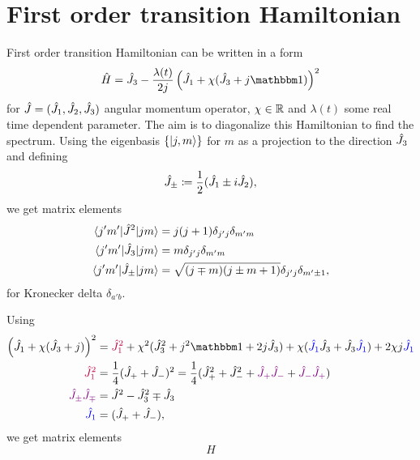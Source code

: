 \chapter{First order transition Hamiltonian}
First order transition Hamiltonian can be written in a form
\begin{equation}
    \HH=\J_3-\frac{\lambda(t)}{2j}\left(\J_1+\chi(\J_3+j\Id)\right)^2
    \label{eq:firstOrderTransitionHamiltonian}
\end{equation}
for $\hat{J}=(\hat{J}_1,\hat{J}_2,\hat{J}_3)$ angular momentum operator, $\chi\in\mathbb{R}$ and $\lambda(t)$ some real time dependent parameter. The aim is to diagonalize this Hamiltonian to find the spectrum. Using the eigenbasis $\{\ket{j,m}\}$ for $m$ as a projection to the direction $\hat{J}_3$ and defining
\begin{equation}
    \hat{J}_\pm\coloneqq\frac{1}{2}(\hat{J}_1\pm i\hat{J}_2),
\end{equation}
we get matrix elements
\begin{align}
    \braket{j'm'|\hat{J}^2|jm} &= j(j+1)\delta_{j'j}\delta_{m'm}\\
    \braket{j'm'|\hat{J}_3|jm} &= m \delta_{j'j}\delta_{m'm}\\
    \braket{j'm'|\hat{J}_\pm|jm} &= \sqrt{(j\mp m)(j\pm m+1)}\delta_{j'j}\delta_{m'\pm 1},
\end{align}
for Kronecker delta $\delta_{a'b}$.

Using
\begin{align}
        \left(\J_1+\chi(\J_3+j)\right)^2 &= \textcolor{purple}{\J_1^2} +\chi^2 (\J_3^2+j^2\Id+2j\J_3)+\chi(\textcolor{blue}{\J_1}\J_3+\J_3\textcolor{blue}{\J_1})+2\chi j\textcolor{blue}{\J_1}\\
        \textcolor{purple}{\J_1^2}&= \frac{1}{4}(\J_++\J_-)^2= \frac{1}{4}(\J_+^2+\J_-^2+\textcolor{violet}{\J_+\J_-}+\textcolor{violet}{\J_-\J_+})\\ 
        \textcolor{violet}{\J_\pm\J_\mp}&=\J^2-\J_3^2 \mp \J_3\\
        \textcolor{blue}{\J_1}&=(\J_+ +\J_-),
\end{align}
we get matrix elements
\begin{equation}
    H
\end{equation}